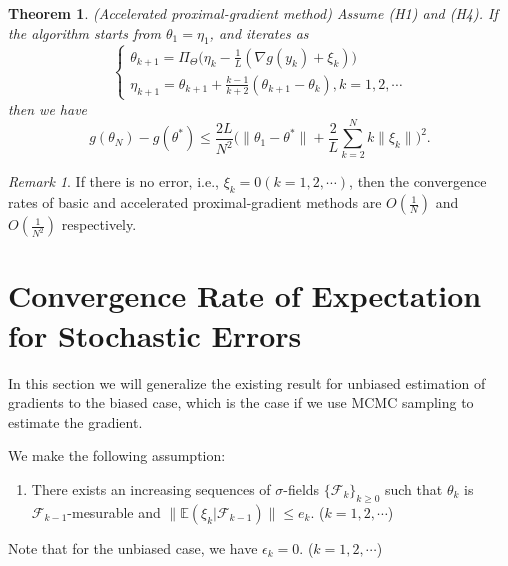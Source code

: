 \documentclass[psamsfonts]{article}
\newtheorem{thm}{Theorem} %
\theoremstyle{definition}
\theoremstyle{remark}
\newtheorem*{rem}{Remark}
\numberwithin{equation} {section}
\begin{document}
\begin{thm}(Accelerated proximal-gradient method)
Assume (H1) and (H4). If the algorithm starts from $\theta_1 = \eta_1$, and iterates as
\begin{equation}\label{acc-prox-iteration}
\begin{cases}
\theta_{k+1} = \Pi_\Theta\big(\eta_k - \frac{1}{L}(\nabla g(y_k) + \xi_k)\big)\\
\eta_{k+1} = \theta_{k+1} + \frac{k-1}{k+2}(\theta_{k+1} - \theta_k), k=1, 2, \cdots
\end{cases}
\end{equation}
then we have
\begin{equation}\label{acc-prox-bound}
g(\theta_N) - g(\theta^*) \le \frac{2L}{N^2}\big( \|\theta_1 - \theta^* \|+ \frac{2}{L}\sum_{k=2}^{N} k\|\xi_k\|\big)^2.
\end{equation}
\end{thm}

\begin{rem}
If there is no error, i.e., $\xi_k=0(k=1,2,\cdots)$, then the convergence rates of basic and accelerated proximal-gradient methods are $O(\frac{1}{N})$ and $O(\frac{1}{N^2})$ respectively.
\end{rem}

\section{Convergence Rate of Expectation for Stochastic Errors}

In this section we will generalize the existing result for unbiased estimation of gradients to the biased case, which is the case if we use MCMC sampling to estimate the gradient.

We make the following assumption:
\begin{enumerate}[(H6)]
\item There exists an increasing sequences of $\sigma$-fields $\{\mathcal F_k\}_{k\ge0}$ such that $\theta_k$ is $\mathcal F_{k-1}$-mesurable and $\|\mathbb E(\xi_k|\mathcal F_{k-1}) \| \le e_k$. ($k=1,2,\cdots$)
\end{enumerate}

Note that for the unbiased case, we have $\epsilon_k=0$. ($k=1,2,\cdots$)
\end{document}
